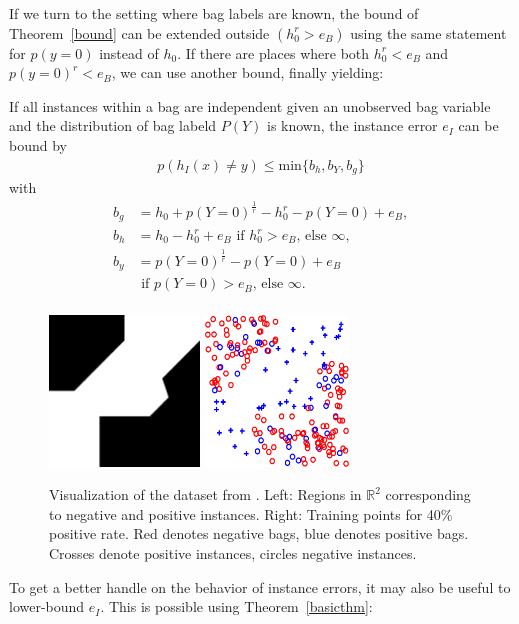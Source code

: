 If we turn to the setting where bag labels are known, the bound of Theorem~\ref{bound} can be extended outside $( h_0^r > e_B)$
using the same statement for $p(y=0)$ instead of $h_0$. If there are places where both $h_0^r < e_B$ and
$p(y=0)^r < e_B$, we can use another bound, finally yielding:

\begin{theorem}\label{globalbound}
    If all instances within a bag are independent given an unobserved bag variable and the distribution of
    bag labeld $P(Y)$ is known, the instance error $e_I$ can
    be bound by
\begin{align}
    p(h_I(x)\neq y) \leq \text{min}\{ b_h, b_Y, b_g \} 
\end{align}
with
\begin{align*}
b_g &= h_0 + p(Y=0)^\frac{1}{r} - h_0^r - p(Y=0) + e_B,  \\
b_h &= h_0 - h_0^r + e_B \text{\ if } h_0^r > e_B \text{, else }\infty, \\
b_y &= p(Y=0)^\frac{1}{r} - p(Y=0) + e_B \\
&\text{\ if } p(Y=0) > e_B \text{, else }\infty. \\
\end{align*}
\end{theorem}

\begin{figure}[tbp]
	\begin{center}
		\includegraphics[height=40mm]{images/gehler_decision_boundary.png}\hspace{5px}
		\includegraphics[height=40mm]{images/gehler_instances.png}
	\end{center}
	\caption{Visualization of the dataset from \citet{gehler2007deterministic}. Left: Regions in $\mathbb{R}^2$
    corresponding to negative and positive instances. Right: Training points for 40\% positive rate. Red denotes negative
    bags, blue denotes positive bags. Crosses denote positive instances, circles negative instances.}

\end{figure}
To get a better handle on the behavior of instance errors, it may also be useful to lower-bound $e_I$.
This is possible using Theorem~\ref{basicthm}:

